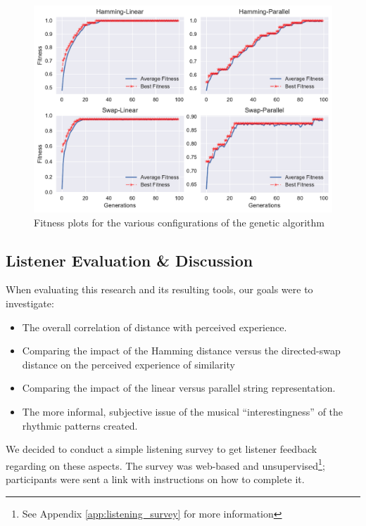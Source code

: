 \begin{figure}
	\begin{center}
		\includegraphics[width=\figSizeHundred]{ch03_symbolic/figures/best_average_fitness.pdf}
	\end{center}
	\caption[Fitness plots for the various configurations of the genetic algorithm]{Fitness plots for the various configurations of the genetic algorithm}
	\label{fig:genetic}
\end{figure}

\subsection{Listener Evaluation \& Discussion}

When evaluating this research and its resulting tools, our goals were to investigate:

\begin{itemize}
	\item The overall correlation of distance with perceived experience.
	\item Comparing the impact of the Hamming distance versus the directed-swap distance on the perceived experience of similarity
	\item Comparing the impact of the linear versus parallel string representation.
	\item The more informal, subjective issue of the musical ``interestingness'' of the rhythmic patterns created.
\end{itemize}


We decided to conduct a simple listening survey to get listener feedback regarding on these aspects. The survey was web-based and unsupervised\footnote{See Appendix \ref{app:listening_survey} for more information}; participants were sent a link with instructions on how to complete it. 


